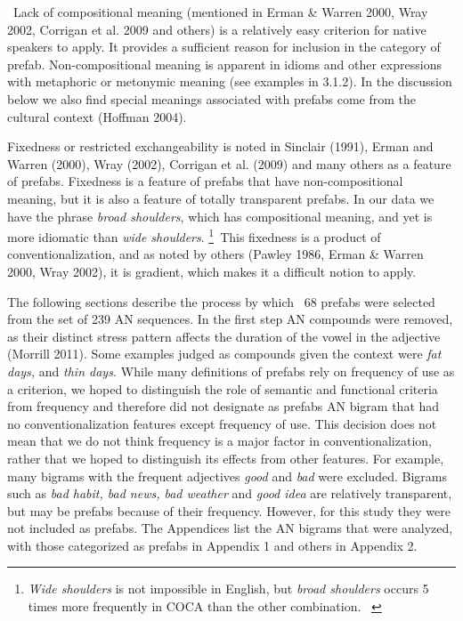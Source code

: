 \documentclass[12pt]{article}
\newcommand\textstyleFootnoteSymbol[1]{{\fontsize{6.5pt}{7.8pt}\selectfont #1}}
\newenvironment{styleStandard}{\setlength\leftskip{0cm}\setlength\rightskip{0cm plus 1fil}\setlength\parindent{0cm}\setlength\parfillskip{0pt plus 1fil}\setlength\parskip{0in plus 1pt}\writerlistparindent\writerlistleftskip\leavevmode\normalfont\normalsize\writerlistlabel\ignorespaces}{\unskip\vspace{0.111in plus 0.0111in}\par}
\newcommand\writerlistleftskip{}
\newcommand\writerlistparindent{}
\newcommand\writerlistlabel{}
\begin{document}
\begin{styleStandard}
\ Lack of compositional meaning (mentioned in Erman \& Warren 2000, Wray 2002, Corrigan et al. 2009 and others) is a relatively easy criterion for native speakers to apply. It provides a sufficient reason for inclusion in the category of prefab. Non-compositional meaning is apparent in idioms and other expressions with metaphoric or metonymic meaning (see examples in 3.1.2). In the discussion below we also find special meanings associated with prefabs come from the cultural context (Hoffman 2004). 
\end{styleStandard}

\begin{styleStandard}
Fixedness or restricted exchangeability is noted in Sinclair (1991), Erman and Warren (2000), Wray (2002), Corrigan et al. (2009) and many others as a feature of prefabs. Fixedness is a feature of prefabs that have non-compositional meaning, but it is also a feature of totally transparent prefabs. In our data we have the phrase \textit{broad shoulders}, which has compositional meaning, and yet is more idiomatic than \textit{wide shoulders}.\textstyleFootnoteSymbol{\textit{ }}\footnote{ \textit{Wide shoulders} is not impossible in English, but \textit{broad shoulders} occurs 5 times more frequently in COCA than the other combination. \ }\ This fixedness is a product of conventionalization, and as noted by others (Pawley 1986, Erman \& Warren 2000, Wray 2002), it is gradient, which makes it a difficult notion to apply. 
\end{styleStandard}

\begin{styleStandard}
The following sections describe the process by which \ 68 prefabs were selected from the set of 239 AN sequences. In the first step AN compounds were removed, as their distinct stress pattern affects the duration of the vowel in the adjective (Morrill 2011). Some examples judged as compounds given the context were \textit{fat days, }and\textit{ thin days.} While many definitions of prefabs rely on frequency of use as a criterion, we hoped to distinguish the role of semantic and functional criteria from frequency and therefore did not designate as prefabs AN bigram that had no conventionalization features except frequency of use. This decision does not mean that we do not think frequency is a major factor in conventionalization, rather that we hoped to distinguish its effects from other features. For example, many bigrams with the frequent adjectives \textit{good} and \textit{bad} were excluded. Bigrams such as \textit{bad habit, bad news, bad weather} and \textit{good idea} are relatively transparent, but may be prefabs because of their frequency. However, for this study they were not included as prefabs. The Appendices list the AN bigrams that were analyzed, with those categorized as prefabs in Appendix 1 and others in Appendix 2. 
\end{styleStandard}
\end{document}
